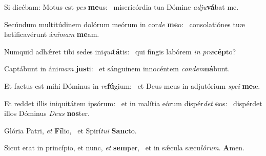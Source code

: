 \item Si dicébam: Motus est \textit{pes} \textbf{me}us:~\psstar{} misericórdia tua Dómine \textit{adju}\textbf{vá}bat me.
\item Secúndum multitúdinem dolórum meórum in cor\textit{de} \textbf{me}o:~\psstar{} consolatiónes tuæ lætificavérunt á\textit{nimam} \textbf{me}am.
\item Numquid adhǽret tibi sedes ini\textit{qui}\textbf{tá}tis:~\psstar{} qui fingis labórem \textit{in} \textit{præ}\textbf{cép}to?
\item Captábunt in áni\textit{mam} \textbf{jus}ti:~\psstar{} et sánguinem innocéntem \textit{condem}\textbf{ná}bunt.
\item Et factus est mihi Dóminus in \textit{re}\textbf{fú}gium:~\psstar{} et Deus meus in adjutórium \textit{spei} \textbf{me}æ.
\item Et reddet illis iniquitátem ipsórum:~\pscross{} et in malítia eórum dispér\textit{det} \textbf{e}os:~\psstar{} dispérdet illos Dóminus \textit{Deus} \textbf{nos}ter.
\item Glória Patri, \textit{et} \textbf{Fí}lio,~\psstar{} et Spirí\textit{tui} \textbf{Sanc}to.
\item Sicut erat in princípio, et nunc, \textit{et} \textbf{sem}per,~\psstar{} et in sǽcula sæcu\textit{lórum}. \textbf{A}men.
